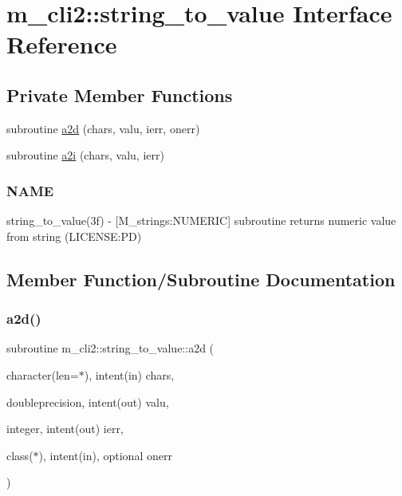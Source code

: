 \hypertarget{interfacem__cli2_1_1string__to__value}{}\section{m\+\_\+cli2\+:\+:string\+\_\+to\+\_\+value Interface Reference}
\label{interfacem__cli2_1_1string__to__value}
\subsection*{Private Member Functions}
\begin{DoxyCompactItemize}
\item 
subroutine \mbox{\hyperlink{interfacem__cli2_1_1string__to__value_ad579c3183bd46ec64ac2f6517b71da0e}{a2d}} (chars, valu, ierr, onerr)
\item 
subroutine \mbox{\hyperlink{interfacem__cli2_1_1string__to__value_af221de32e1c7dd6915ea45dc3a0147ed}{a2i}} (chars, valu, ierr)
\begin{DoxyCompactList}\small\item\em \subsubsection*{N\+A\+ME}

string\+\_\+to\+\_\+value(3f) -\/ \mbox{[}M\+\_\+strings\+:N\+U\+M\+E\+R\+IC\mbox{]} subroutine returns numeric value from string (L\+I\+C\+E\+N\+SE\+:PD) \end{DoxyCompactList}\end{DoxyCompactItemize}


\subsection{Member Function/\+Subroutine Documentation}
\mbox{\label{interfacem__cli2_1_1string__to__value_ad579c3183bd46ec64ac2f6517b71da0e}} 
\subsubsection{\texorpdfstring{a2d()}{a2d()}}
{\footnotesize\ttfamily subroutine m\+\_\+cli2\+::string\+\_\+to\+\_\+value\+::a2d (\begin{DoxyParamCaption}\item[{character(len=$\ast$), intent(in)}]{chars,  }\item[{doubleprecision, intent(out)}]{valu,  }\item[{integer, intent(out)}]{ierr,  }\item[{class($\ast$), intent(in), optional}]{onerr }\end{DoxyParamCaption})\hspace{0.3cm}{\ttfamily [private]}}

